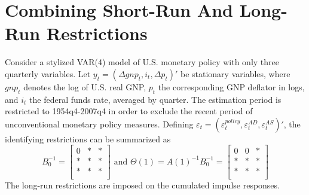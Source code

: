 \documentclass[a4paper]{scrartcl}
\begin{document}
\section{Combining Short-Run And Long-Run Restrictions}
Consider a stylized VAR(4) model of U.S. monetary policy with only three quarterly variables. Let $y_t = (\Delta gnp_t, i_t, \Delta p_t)'$ be stationary variables, where $gnp_t$ denotes the log of U.S. real GNP, $p_t$ the corresponding GNP deflator in logs, and $i_t$ the federal funds rate, averaged by quarter. The estimation period is restricted to 1954q4-2007q4 in order to exclude the recent period of unconventional monetary policy measures. Defining $\varepsilon_t = (\varepsilon_t^{policy}, \varepsilon_t^{AD}, \varepsilon_t^{AS})'$, the identifying restrictions can be summarized as
$$B_0^{-1}  = \begin{bmatrix}
0 & * & *\\
* & * & *\\
* & * & *\\
\end{bmatrix} \text{ and }
\Theta(1) = A(1)^{-1} B_0^{-1} =  \begin{bmatrix}
0 & 0 & *\\
* & * & *\\
* & * & *\\
\end{bmatrix}
$$
The long-run restrictions are imposed on the cumulated impulse responses.
\end{document}
